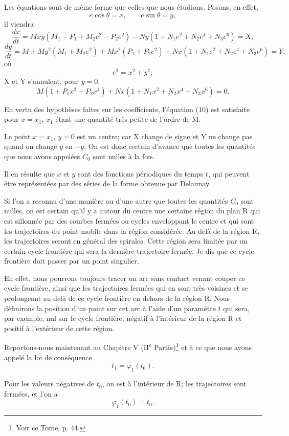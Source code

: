 \documentclass[11pt]{article}
\begin{document}
Les équations sont de même forme que celles que nous étudions. Posons, en effet,
\[
e\cos\theta=x,
\qquad
e\sin\theta=y,
\]
il viendra
\[
\frac{dx}{dt}=Mxy(M_1-P_1+M_2e^2-P_2e^2)-Ny(1+N_1e^2+N_2e^4+N_3e^6)=X,
\]
\[
\frac{dy}{dt}=M+My^2(M_1+M_2e^2)+Mx^2(P_1+P_2e^2)+Nx(1+N_1e^2+N_2e^4+N_3e^6)=Y,
\]
où
\[
e^2=x^2+y^2;
\]
X et Y s’annulent, pour $y=0$,
\begin{equation}\tag{10}
M(1+P_1x^2+P_2x^4)+Nx(1+N_1x^2+N_2x^4+N_3x^6)=0.
\end{equation}

En vertu des hypothèses faites sur les coefficients, l’équation (10) est satisfaite pour $x=x_1$, $x_1$ étant une quantité très petite de l’ordre de M.

Le point $x=x_1$, $y=0$ est un centre; car X change de signe et Y ne change pas quand on change $y$ en $-y$. On est donc certain d’avance que toutes les quantités que nous avons appelées $C_0$ sont nulles à la fois.

Il en résulte que $x$ et $y$ sont des fonctions périodiques du temps $t$, qui peuvent être représentées par des séries de la forme obtenue par Delaunay.

Si l’on a reconnu d’une manière ou d’une autre que toutes les quantités $C_0$ sont nulles, on est certain qu’il y a autour du centre une certaine région du plan R qui est sillonnée par des courbes fermées ou cycles enveloppant le centre et qui sont les trajectoires du point mobile dans la région considérée. Au delà de la région R, les trajectoires seront en général des spirales. Cette région sera limitée par un certain cycle frontière qui sera la dernière trajectoire fermée. Je dis que ce cycle frontière doit passer par un point singulier.

En effet, nous pourrons toujours tracer un arc sans contact venant couper ce cycle frontière, ainsi que les trajectoires fermées qui en sont très voisines et se prolongeant au delà de ce cycle frontière en dehors de la région R. Nous définirons la position d’un point sur cet arc à l’aide d’un paramètre $t$ qui sera, par exemple, nul sur le cycle frontière, négatif à l’intérieur de la région R et positif à l’extérieur de cette région.

Reportons-nous maintenant au Chapitre V (II\textsuperscript{e} Partie)\footnote{Voir ce Tome, p. 44.} et à ce que nous avons appelé la loi de conséquence
\[
t_1=\varphi_1(t_0).
\]

Pour les valeurs négatives de $t_0$, on est à l’intérieur de R; les trajectoires sont fermées, et l’on a
\[
\varphi_1(t_0)=t_0.
\]
\end{document}
